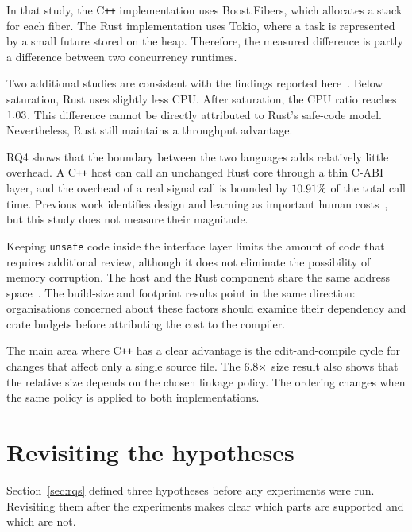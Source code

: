 \documentclass[english,oneside,a4paper,censored,csm,software-track-2020]{HYthesisML}
\begin{document}
In that study, the C\texttt{++} implementation uses Boost.Fibers, which
allocates a stack for each fiber. The Rust implementation uses Tokio, where a
task is represented by a small future stored on the heap. Therefore, the
measured difference is partly a difference between two concurrency runtimes.

Two additional studies are consistent with the findings reported
here~\cite{olsson2023ranmgmt,sundvisson2026drivers}. Below saturation, Rust
uses slightly less CPU. After saturation, the CPU ratio reaches
$1.03$. This difference cannot be directly attributed to
Rust's safe-code model. Nevertheless, Rust still maintains a throughput
advantage.

RQ4 shows that the boundary between the two languages adds relatively little
overhead. A C\texttt{++} host can call an unchanged Rust core through a thin
C-ABI layer, and the overhead of a real signal call is bounded by
$10.91\%$ of the total call time. Previous work identifies design and
learning as important human costs~\cite{fulton2021adopting,crichton2024learning},
but this study does not measure their magnitude.

Keeping \texttt{unsafe} code inside the interface layer limits the amount of
code that requires additional review, although it does not eliminate the
possibility of memory corruption. The host and the Rust component share the
same address space~\cite{rivera2021galeed,kirth2022pkrusafe}. The build-size
and footprint results point in the same direction: organisations concerned about
these factors should examine their dependency and crate budgets before
attributing the cost to the compiler.

The main area where C\texttt{++} has a clear advantage is the edit-and-compile
cycle for changes that affect only a single source file. The
$6.8\times$ size result also shows that the relative size depends
on the chosen linkage policy. The ordering changes when the same policy is
applied to both implementations.

\section{Revisiting the hypotheses}\label{sec:hypotheses}
Section~\ref{sec:rqs} defined three hypotheses before any experiments were run.
Revisiting them after the experiments makes clear which parts are supported and
which are not.
\end{document}

